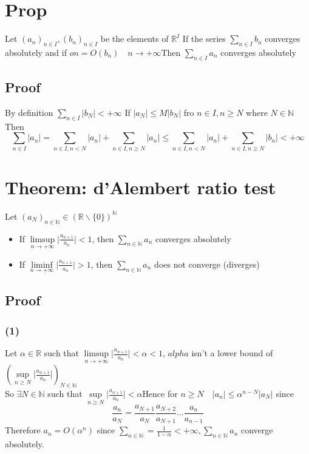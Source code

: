 \documentclass{book}
\begin{document}
\section{Prop}
Let $(a_n)_{n\in I},(b_n)_{n\in I}$ be the elements of $\mathbb{R}^I$ If the series $\sum\limits_{n\in I}b_n$ converges absolutely and if $on=O(b_n)\quad n\rightarrow+\infty$Then $\sum\limits_{n\in I}a_n$ converges absolutely
\subsection{Proof}
By definition $\sum\limits_{n\in I}\lvert b_N\rvert<+\infty $ If $\lvert a_N\rvert\leq M\lvert b_N\rvert$ fro $n\in I,n\geq N$ where $N\in \mathbb{N} $ Then $$\sum\limits_{n\in I}\lvert a_n\rvert=\sum\limits_{n\in I,n<N}\lvert a_n\rvert+\sum\limits_{n\in I,n\geq N}\lvert a_n\rvert\leq\sum\limits_{n\in I,n<N}\lvert a_n\rvert+\sum\limits_{n\in I,n\geq N}\lvert b_n\rvert<+\infty$$
\section{Theorem: d'Alembert ratio test}
Let $(a_N)_{n\in \mathbb{N} }\in(\mathbb{R} \backslash\{0\})^\mathbb{N} $\begin{itemize}
    \item If $\limsup\limits_{n\rightarrow+\infty}\lvert\frac{a_{n+1}}{a_n}\rvert<1$, then $\sum\limits_{n\in \mathbb{N} }a_n$ converges absolutely
    \item If $\liminf\limits_{n\rightarrow+\infty}\lvert\frac{a_{n+1}}{a_n}\rvert>1$, then $\sum\limits_{n\in \mathbb{N} }a_n$ does not converge (diverges)
\end{itemize}
\subsection{Proof}
\subsubsection*{(1)}Let $\alpha\in\mathbb{R} $ such that $\limsup\limits_{n\rightarrow+\infty}\lvert\frac{a_{n+1}}{a_n}\rvert<\alpha<1$, $alpha$ isn't a lower bound of $(\sup\limits_{n\geq N}\lvert\frac{a_{n+1}}{a_n}\rvert)_{N\in\mathbb{N} }$\\
So $\exists N\in\mathbb{N} $ such that $\sup\limits_{n\geq N}\lvert\frac{a_{n+1}}{a_n}\rvert<\alpha$Hence for $n\geq N\quad\lvert a_n\rvert\leq\alpha^{n-N}\lvert a_N\rvert$ since $$\frac{a_n}{a_N}=\frac{a_{N+1}}{a_N}
\frac{a_{N+2}}{a_{N+1}}...\frac{a_n}{a_{n-1}}$$
Therefore $a_n=O(\alpha^n)$ since $\sum\limits_{n\in\mathbb{N} }=\frac{1}{1-\alpha}<+\infty,\sum\limits_{n\in \mathbb{N} }a_n$ converge absolutely.
\end{document}
